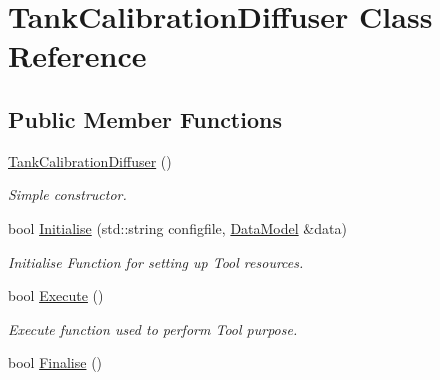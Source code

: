 \hypertarget{classTankCalibrationDiffuser}{
\section{TankCalibrationDiffuser Class Reference}
\label{classTankCalibrationDiffuser}
}
\subsection*{Public Member Functions}
\begin{DoxyCompactItemize}
\item 
\hypertarget{classTankCalibrationDiffuser_a900c4bd77a6b1f239afee419a12693c8}{
\hyperlink{classTankCalibrationDiffuser_a900c4bd77a6b1f239afee419a12693c8}{TankCalibrationDiffuser} ()}
\label{classTankCalibrationDiffuser_a900c4bd77a6b1f239afee419a12693c8}

\begin{DoxyCompactList}\small\item\em Simple constructor. \item\end{DoxyCompactList}\item 
bool \hyperlink{classTankCalibrationDiffuser_a7238278dec1744e7ff2b9d429646d5a0}{Initialise} (std::string configfile, \hyperlink{classDataModel}{DataModel} \&data)
\begin{DoxyCompactList}\small\item\em Initialise Function for setting up Tool resources. \item\end{DoxyCompactList}\item 
\hypertarget{classTankCalibrationDiffuser_a5431ce6ae31c56e05ea582a1e7cc1b09}{
bool \hyperlink{classTankCalibrationDiffuser_a5431ce6ae31c56e05ea582a1e7cc1b09}{Execute} ()}
\label{classTankCalibrationDiffuser_a5431ce6ae31c56e05ea582a1e7cc1b09}

\begin{DoxyCompactList}\small\item\em Execute function used to perform Tool purpose. \item\end{DoxyCompactList}\item 
\hypertarget{classTankCalibrationDiffuser_a04a9fda76df45563f8b0af616d6d1c69}{
bool \hyperlink{classTankCalibrationDiffuser_a04a9fda76df45563f8b0af616d6d1c69}{Finalise} ()}
\label{classTankCalibrationDiffuser_a04a9fda76df45563f8b0af616d6d1c69}


\end{DoxyCompactItemize}
